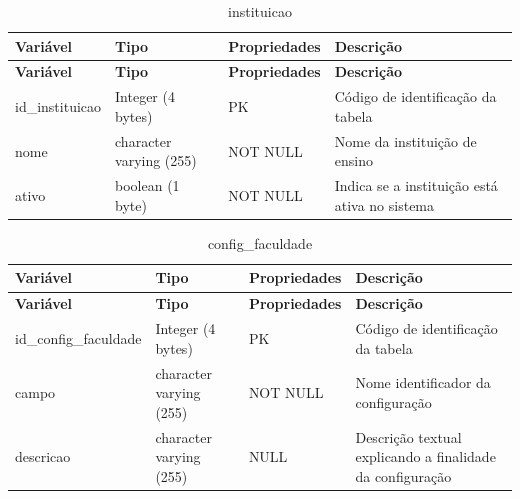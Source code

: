 \vspace{\baselineskip}

\Needspace{0.32\textheight}
\begin{longtable}{|L{5.2cm}|L{3.2cm}|L{2.4cm}|L{3.4cm}|}
\caption{instituicao} \\
\hline
\textbf{Variável} & \textbf{Tipo} & \textbf{Propriedades} & \textbf{Descrição} \\
\hline
\endfirsthead
\hline
\textbf{Variável} & \textbf{Tipo} & \textbf{Propriedades} & \textbf{Descrição} \\
\hline
\endhead
id\_instituicao & Integer (4 bytes) & PK & Código de identificação da tabela \\
\hline
nome & character varying (255) & NOT NULL & Nome da instituição de ensino \\
\hline
ativo & boolean (1 byte) & NOT NULL & Indica se a instituição está ativa no sistema \\
\hline
\end{longtable}

\fonteautores

\vspace{\baselineskip}

\Needspace{0.32\textheight}
\begin{longtable}{|L{5.2cm}|L{3.2cm}|L{2.4cm}|L{3.4cm}|}
\caption{config\_faculdade} \\
\hline
\textbf{Variável} & \textbf{Tipo} & \textbf{Propriedades} & \textbf{Descrição} \\
\hline
\endfirsthead
\hline
\textbf{Variável} & \textbf{Tipo} & \textbf{Propriedades} & \textbf{Descrição} \\
\hline
\endhead
id\_config\_faculdade & Integer (4 bytes) & PK & Código de identificação da tabela \\
\hline
campo & character varying (255) & NOT NULL & Nome identificador da configuração \\
\hline
descricao & character varying (255) & NULL & Descrição textual explicando a finalidade da configuração \\
\hline
\end{longtable}

\fonteautores

\vspace{\baselineskip}

